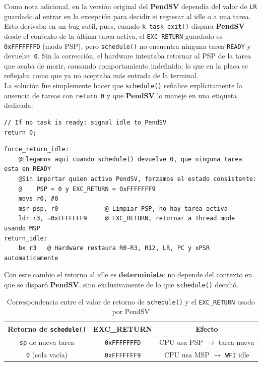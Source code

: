 \documentclass[12pt,letterpaper]{article}
\begin{document}
Como nota adicional, en  la versión original del \textbf{PendSV} dependía del valor de \texttt{LR} guardado al entrar en la excepción para decidir si regresar al idle o a una tarea. Esto derivaba en un bug sutil, pues, cuando \texttt{k\_task\_exit()} dispara \textbf{PendSV} desde el contexto de la última tarea activa, el \texttt{EXC\_RETURN} guardado es \texttt{0xFFFFFFFD} (modo PSP), pero \texttt{schedule()} no encuentra ninguna tarea \texttt{READY} y devuelve~\texttt{0}. Sin la corrección, el hardware intentaba retornar al PSP de la tarea que acaba de morir, causando comportamiento indefinido; lo que en la placa se reflejaba como que ya no aceptaba más entrada de la terminal.\\

La solución fue simplemente hacer que \texttt{schedule()} señalice explícitamente la ausencia de tareas con \texttt{return 0} y que \textbf{PendSV} lo maneje en una etiqueta dedicada:

\begin{lstlisting}[style=modernc, caption={Señal de cola vacía en \texttt{schedule()}}]
// If no task is ready: signal idle to PendSV
return 0;
\end{lstlisting}

\begin{lstlisting}[style=modernasm, caption={Retorno determinista a idle en \texttt{pendsv.s} }]
force_return_idle:
    @Llegamos aqui cuando schedule() devuelve 0, que ninguna tarea esta en READY
    @Sin importar quien activo PendSV, forzamos el estado consistente:
    @    PSP = 0 y EXC_RETURN = 0xFFFFFFF9
    movs r0, #0
    msr psp, r0             @ Limpiar PSP, no hay tarea activa
    ldr r3, =0xFFFFFFF9     @ EXC_RETURN, retornar a Thread mode usando MSP
return_idle:
    bx r3   @ Hardware restaura R0-R3, R12, LR, PC y xPSR automaticamente
\end{lstlisting}

Con este cambio el retorno al idle es \textbf{determinista}: no depende del contexto
en que se disparó \textbf{PendSV}, sino exclusivamente de lo que \texttt{schedule()}
decidió.

\begin{table}[H]
  \centering
  \caption{Correspondencia entre el valor de retorno de \texttt{schedule()} y el
           \texttt{EXC\_RETURN} usado por PendSV}
  \begin{tabular}{ccc}
    \textbf{Retorno de \texttt{schedule()}} & \textbf{EXC\_RETURN} & \textbf{Efecto} \\
    \hline
    \texttt{sp} de nueva tarea & \texttt{0xFFFFFFFD} & CPU usa PSP $\to$ tarea nueva \\
    \texttt{0} (cola vacía)    & \texttt{0xFFFFFFF9} & CPU usa MSP $\to$ \texttt{WFI} idle \\
  \end{tabular}
\end{table}
 
\end{document}
